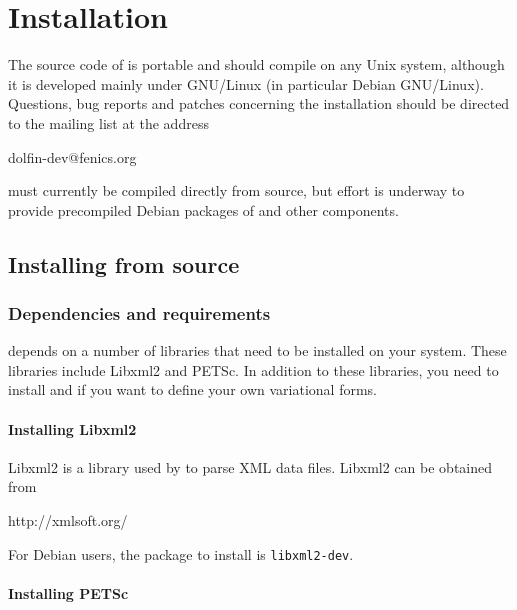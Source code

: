 \chapter{Installation}
\label{app:installation}

The source code of \dolfin{} is portable and should compile on any
Unix system, although it is developed mainly under GNU/Linux
(in particular Debian GNU/Linux). Questions, bug reports and patches
concerning the installation should be directed to the
\dolfin{} mailing list at the address
\begin{code}
  dolfin-dev@fenics.org
\end{code}

\dolfin{} must currently be compiled directly from source, but effort
is underway to provide precompiled Debian packages of \dolfin{} and
other \fenics{} components.

\section{Installing from source}

\subsection{Dependencies and requirements}

\dolfin{} depends on a number of libraries that need to be installed on your
system. These libraries include Libxml2 and PETSc. In addition to these libraries,
you need to install \fiat{} and \ffc{} if you want to define your own variational forms.

\subsubsection{Installing Libxml2}

Libxml2 is a library used by \dolfin{} to parse XML data files. Libxml2 can be obtained from
\begin{code}
  http://xmlsoft.org/
\end{code}
For Debian users, the package to install is \texttt{libxml2-dev}.

\subsubsection{Installing PETSc}

